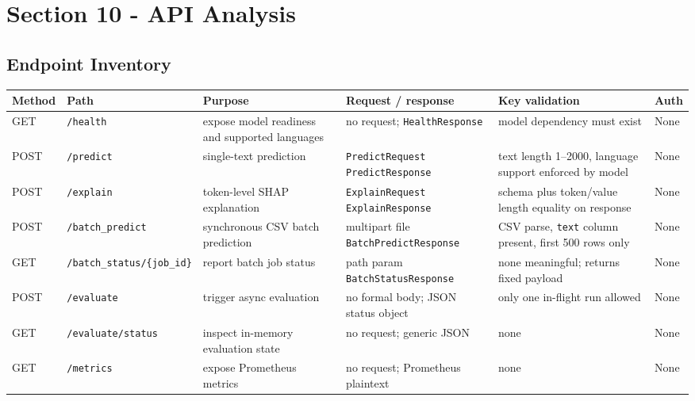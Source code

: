 \section{Section 10 - API Analysis}
\subsection{Endpoint Inventory}
\begin{longtable}{@{}p{}p{}p{}p{}p{}p{}@{}}
\toprule
\textbf{Method} & \textbf{Path} & \textbf{Purpose} & \textbf{Request / response} & \textbf{Key validation} & \textbf{Auth} \\
\midrule
\endhead
GET & \texttt{/health} & expose model readiness and supported languages & no request; \texttt{HealthResponse} & model dependency must exist & None \\
POST & \texttt{/predict} & single-text prediction & \texttt{PredictRequest} \textrightarrow{} \texttt{PredictResponse} & text length 1--2000, language support enforced by model & None \\
POST & \texttt{/explain} & token-level SHAP explanation & \texttt{ExplainRequest} \textrightarrow{} \texttt{ExplainResponse} & schema plus token/value length equality on response & None \\
POST & \texttt{/batch\_predict} & synchronous CSV batch prediction & multipart file \textrightarrow{} \texttt{BatchPredictResponse} & CSV parse, \texttt{text} column present, first 500 rows only & None \\
GET & \texttt{/batch\_status/\{job\_id\}} & report batch job status & path param \textrightarrow{} \texttt{BatchStatusResponse} & none meaningful; returns fixed payload & None \\
POST & \texttt{/evaluate} & trigger async evaluation & no formal body; JSON status object & only one in-flight run allowed & None \\
GET & \texttt{/evaluate/status} & inspect in-memory evaluation state & no request; generic JSON & none & None \\
GET & \texttt{/metrics} & expose Prometheus metrics & no request; Prometheus plaintext & none & None \\
\bottomrule
\end{longtable}

